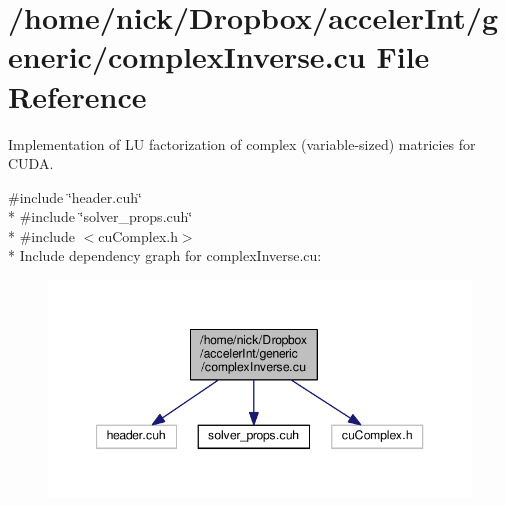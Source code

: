 \hypertarget{complexInverse_8cu}{}\section{/home/nick/\+Dropbox/acceler\+Int/generic/complex\+Inverse.cu File Reference}
\label{complexInverse_8cu}


Implementation of LU factorization of complex (variable-\/sized) matricies for C\+U\+DA.  


{\ttfamily \#include \char`\"{}header.\+cuh\char`\"{}}\\*
{\ttfamily \#include \char`\"{}solver\+\_\+props.\+cuh\char`\"{}}\\*
{\ttfamily \#include $<$cu\+Complex.\+h$>$}\\*
Include dependency graph for complex\+Inverse.\+cu\+:
\nopagebreak
\begin{figure}[H]
\begin{center}
\leavevmode
\includegraphics[width=347pt]{complexInverse_8cu__incl}
\end{center}
\end{figure}
